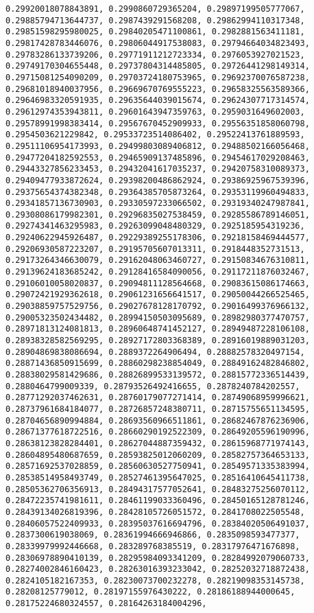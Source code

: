 \documentclass[11pt]{article}
\begin{document}
\begin{Verbatim}[commandchars=\\\{\}]
0.29920018078843891, 0.2990860729365204, 0.29897199505777067, 0.29885794713644737, 0.2987439291568208, 0.29862994110317348, 0.29851598295980025, 0.29840205471100861, 0.2982881563411181, 0.29817428783446076, 0.29806044917538083, 0.29794664034823493, 0.29783286133739206, 0.29771911212723334, 0.2976053927021523, 0.29749170304655448, 0.29737804314485805, 0.29726441298149314, 0.29715081254090209, 0.29703724180753965, 0.29692370076587238, 0.29681018940037956, 0.29669670769555223, 0.29658325563589366, 0.29646983320591935, 0.29635644039015674, 0.29624307717314574, 0.29612974353943811, 0.29601643947359763, 0.2959031649602003, 0.29578991998383414, 0.29567670452909933, 0.29556351858060798, 0.2954503621229842, 0.29533723514086402, 0.29522413761889593, 0.29511106954173993, 0.29499803089406812, 0.29488502166056468, 0.29477204182592553, 0.29465909137485896, 0.29454617029208463, 0.29443327856233453, 0.29432041617035237, 0.29420758310089373, 0.29409477933872624, 0.29398200486862924, 0.29386925967539396, 0.29375654374382348, 0.29364385705873264, 0.29353119960494833, 0.29341857136730903, 0.29330597233066502, 0.29319340247987841, 0.29308086179982301, 0.29296835027538459, 0.29285586789146051, 0.29274341463295983, 0.29263099048480329, 0.2925185954319236, 0.29240622945926487, 0.29229389255178306, 0.29218158469444577, 0.29206930587223207, 0.29195705607013311, 0.2918448352731513, 0.29173264346630079, 0.29162048063460727, 0.29150834676310811, 0.29139624183685242, 0.29128416584090056, 0.29117211876032467, 0.29106010058020837, 0.29094811128564668, 0.29083615086174663, 0.29072421929362618, 0.29061231656641517, 0.29050044266525465, 0.29038859757529756, 0.29027678128170792, 0.29016499376966132, 0.29005323502434482, 0.28994150503095689, 0.28982980377470757, 0.28971813124081813, 0.28960648741452127, 0.28949487228106108, 0.28938328582569295, 0.28927172803368389, 0.28916019889031203, 0.28904869838086694, 0.2889372264906494, 0.28882578320497154, 0.28871436850915699, 0.28860298238854049, 0.28849162482846802, 0.28838029581429686, 0.28826899533139572, 0.28815772336514439, 0.2880464799009339, 0.28793526492416655, 0.2878240784202557, 0.28771292037462631, 0.28760179077271414, 0.28749068959996621, 0.28737961684184077, 0.28726857248380711, 0.28715755651134595, 0.28704656890994884, 0.28693560966511861, 0.28682467876236906, 0.28671377618722516, 0.28660290192522309, 0.28649205596190996, 0.28638123828284401, 0.28627044887359432, 0.28615968771974143, 0.28604895480687659, 0.28593825012060209, 0.28582757364653133, 0.28571692537028859, 0.28560630527750941, 0.28549571335383994, 0.28538514958493749, 0.28527461395647025, 0.28516410645411738, 0.28505362706356913, 0.28494317577052641, 0.28483275256070112, 0.28472235741981611, 0.28461199033360496, 0.28450165128781246, 0.28439134026819396, 0.28428105726051572, 0.2841708022505548, 0.28406057522409933, 0.28395037616694796, 0.28384020506491037, 0.2837300619038069, 0.28361994666946866, 0.2835098593477377, 0.28339979992446668, 0.283289768385519, 0.28317976471676898, 0.28306978890410139, 0.28295984093341209, 0.28284992079060733, 0.28274002846160423, 0.28263016393233042, 0.28252032718872438, 0.2824105182167353, 0.28230073700232278, 0.28219098353145738, 0.28208125779012, 0.28197155976430222, 0.28186188944000645, 0.28175224680324557, 0.28164263184004296, 
\end{Verbatim}
\end{document}
